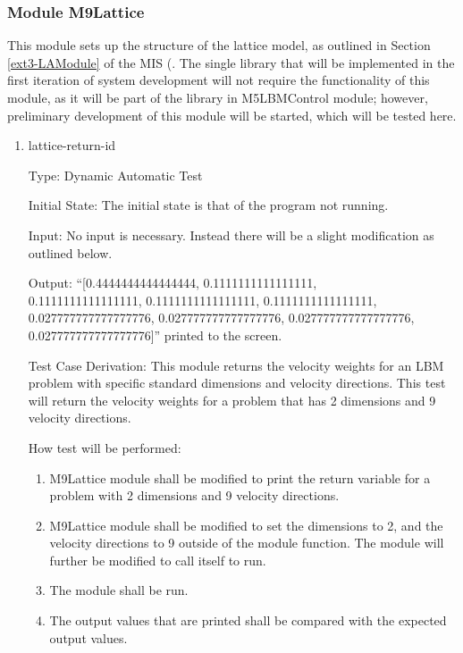 \documentclass[12pt, titlepage]{article}
\newcounter{uvtestcounter} %
\begin{document}
\subsubsection{Module M9Lattice}

This module sets up the structure of the lattice model, as outlined in Section \ref{ext3-LAModule} of the MIS (\citet{LBM_MIS_PM}. The single library that will be implemented in the first iteration of system development will not require the functionality of this module, as it will be part of the library in M5LBMControl module; however, preliminary development of this module will be started, which will be tested here.

\begin{enumerate}
	
	\item{lattice-return-id\theuvtestcounter\\}
	
	Type: Dynamic Automatic Test

Initial State: The initial state is that of the program not running.

Input: No input is necessary. Instead there will be a slight modification as outlined below.
	
	Output: ``[0.4444444444444444, 0.1111111111111111, \\0.1111111111111111, 0.1111111111111111, 0.1111111111111111, \\0.027777777777777776, 0.027777777777777776, 0.027777777777777776, 0.027777777777777776]'' printed to the screen.
	
	Test Case Derivation: This module returns the velocity weights for an LBM problem with specific standard dimensions and velocity directions. This test will return the velocity weights for a problem that has 2 dimensions and 9 velocity directions.

How test will be performed: 
\begin{enumerate}
	\item M9Lattice module shall be modified to print the return variable for a problem with 2 dimensions and 9 velocity directions.
	\item M9Lattice module shall be modified to set the dimensions to 2, and the velocity directions to 9 outside of the module function. The module will further be modified to call itself to run.
	\item The module shall be run. 
	\item The output values that are printed shall be compared with the expected output values.
\end{enumerate}

\end{enumerate}
\end{document}
